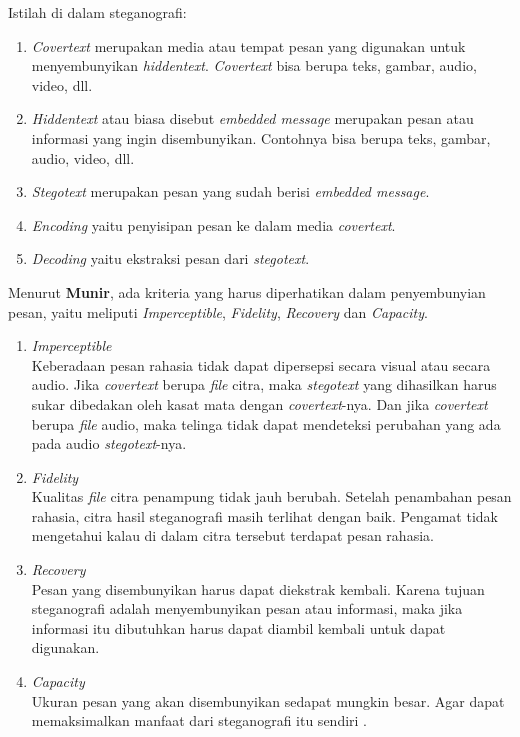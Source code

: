 	Istilah di dalam steganografi:
	\begin{enumerate}
		\item \emph{Covertext} merupakan media atau tempat pesan yang digunakan untuk menyembunyikan \emph{hiddentext}. \emph{Covertext} bisa berupa teks, gambar, audio, video, dll.
		\item \emph{Hiddentext}	atau biasa disebut \emph{embedded message} merupakan pesan atau informasi yang ingin disembunyikan. Contohnya bisa berupa teks, gambar, audio, video, dll.
		\item \emph{Stegotext} merupakan pesan yang sudah berisi \emph{embedded message}.
		\item \emph{Encoding} yaitu penyisipan pesan ke dalam media \emph{covertext}.
		\item \emph{Decoding} yaitu ekstraksi pesan dari \emph{stegotext}.
	\end{enumerate}
	
	Menurut \textbf{Munir}, ada kriteria yang harus diperhatikan dalam penyembunyian pesan, yaitu meliputi \emph{Imperceptible}, \emph{Fidelity}, \emph{Recovery} dan \emph{Capacity}.
	\begin{enumerate}
		\item \emph{Imperceptible}\\ 
		Keberadaan pesan rahasia tidak dapat dipersepsi secara visual atau secara audio. Jika \emph{covertext} berupa \emph{file} citra, maka \emph{stegotext} yang dihasilkan harus sukar dibedakan oleh kasat mata dengan \emph{covertext}-nya. Dan jika \emph{covertext} berupa \emph{file} audio, maka telinga tidak dapat mendeteksi perubahan yang ada pada audio \emph{stegotext}-nya. 
		\item \emph{Fidelity}\\
		Kualitas \emph{file} citra penampung tidak jauh berubah. Setelah penambahan pesan rahasia, citra hasil steganografi masih terlihat dengan baik. Pengamat tidak mengetahui kalau di dalam citra tersebut terdapat pesan rahasia.
		\item \emph{Recovery}\\
		Pesan yang disembunyikan harus dapat diekstrak kembali. Karena tujuan steganografi adalah menyembunyikan pesan atau informasi, maka jika informasi itu dibutuhkan harus dapat diambil kembali untuk dapat digunakan.
		\item \emph{Capacity}\\
		Ukuran pesan yang akan disembunyikan sedapat mungkin besar. Agar dapat memaksimalkan manfaat dari steganografi itu sendiri \cite{munir}.
	\end{enumerate}
	
